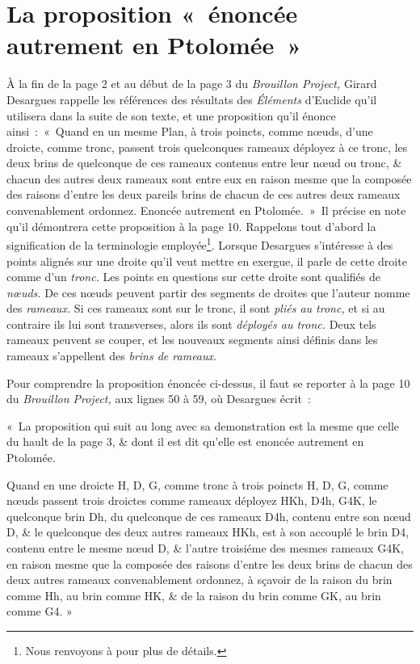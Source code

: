 \documentclass[12pt, a4paper]{article}
\begin{document}
\section{La proposition «~énoncée autrement en Ptolomée~»}
À la fin de la page 2 et au début de la page 3 du \textit{Brouillon Project,} Girard Desargues rappelle les références des résultats des \textit{Éléments} d'Euclide qu'il utilisera dans la suite de son texte, et une proposition qu'il énonce ainsi~:~«~Quand en un mesme Plan, à trois poincts, comme n{\oe}uds, d'une droicte, comme tronc, passent trois quelconques rameaux déployez à ce tronc, les deux brins de quelconque de ces rameaux 
contenus entre leur n{\oe}ud ou tronc, \& chacun des autres deux rameaux sont entre eux en raison
mesme que la composée des raisons d'entre les deux pareils brins de chacun de ces autres deux
rameaux convenablement ordonnez. Enoncée autrement en Ptolomée.~»~Il précise en note qu'il démontrera cette proposition à la page 10. Rappelons tout d'abord la signification de la terminologie employée\footnote{Nous renvoyons à \cite{anglade-briend-1} pour plus de détails.}. Lorsque Desargues s'intéresse à des points alignés sur une droite qu'il veut mettre en exergue, il parle de cette droite comme d'un \textit{tronc.} Les points en questions sur cette droite sont qualifiés de \textit{n{\oe}uds.} De ces n{\oe}uds peuvent partir des segments de droites que l'auteur nomme des \textit{rameaux.} Si ces rameaux sont sur le tronc, il sont \textit{pliés au tronc,} et si au contraire ils lui sont transverses, alors ils sont \textit{déployés au tronc.} Deux tels rameaux peuvent se couper, et les nouveaux segments ainsi définis dans les rameaux s'appellent des \textit{brins de rameaux.} 

Pour comprendre la proposition énoncée ci-dessus, il faut se reporter à la page 10 du \textit{Brouillon Project,} aux lignes 50 à 59, où Desargues écrit~:~

«~La proposition qui suit au long avec sa demonstration est la mesme que celle du hault de la page 3, \& dont il est dit qu'elle est enoncée autrement en Ptolomée.

Quand en une droicte H, D, G, comme tronc à trois poincts H, D, G, comme n{\oe}uds passent trois droictes comme rameaux déployez HKh, D4h, G4K, le quelconque brin Dh, du quelconque de ces rameaux D4h, contenu entre son n{\oe}ud D, \& le quelconque des deux autres rameaux HKh, est à son accouplé le brin D4, contenu entre le mesme n{\oe}ud D, \& l'autre troisiéme des mesmes rameaux G4K, en raison mesme que la composée des raisons d'entre les deux brins de chacun des deux autres rameaux convenablement ordonnez, à sçavoir de la raison du brin comme Hh, au brin comme HK, \& de la raison du brin comme GK, au brin comme G4. » 
\end{document}
